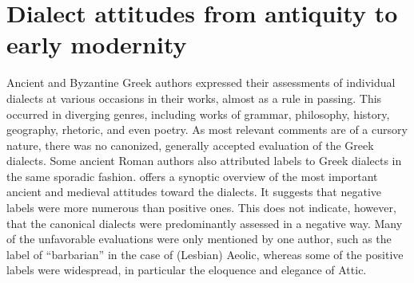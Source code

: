 \section{Dialect attitudes from antiquity to early modernity}\label{sec:7.2}


Ancient and Byzantine Greek authors expressed their assessments of individual dialects at various occasions in their works, almost as a rule in passing. This occurred in diverging genres, including works of grammar, philosophy, history, geography, rhetoric, and even poetry. As most relevant comments are of a cursory nature, there was no canonized, generally accepted evaluation of the Greek dialects. Some ancient Roman authors also attributed labels to Greek dialects in the same sporadic fashion.  offers a synoptic overview of the most important ancient and medieval attitudes toward the dialects. It suggests that negative labels were more numerous than positive ones. This does not indicate, however, that the canonical dialects were predominantly assessed in a negative way. Many of the unfavorable evaluations were only mentioned by one author, such as the label of “barbarian” in the case of (Lesbian) Aeolic, whereas some of the positive labels were widespread, in particular the eloquence and elegance of Attic.

